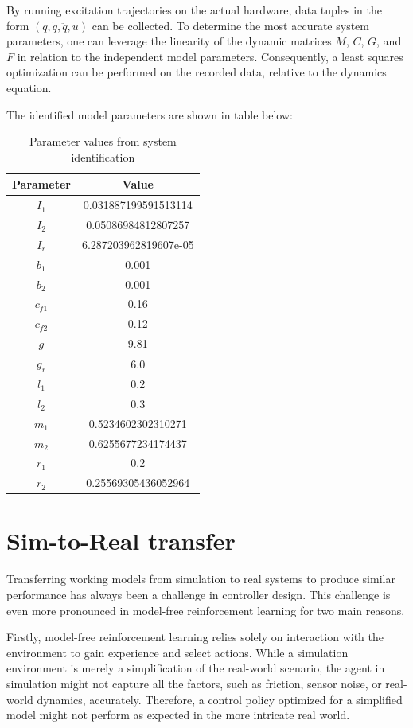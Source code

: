 By running excitation trajectories on the actual hardware, data tuples in the form \((q, \dot{q}, \ddot{q}, u)\) can be collected. To determine the most accurate system parameters, one can leverage the linearity of the dynamic matrices \(M\), \(C\), \(G\), and \(F\) in relation to the independent model parameters. Consequently, a least squares optimization can be performed on the recorded data, relative to the dynamics equation.

The identified model parameters are shown in table below:

\begin{table}[H]
\centering
\begin{tabular}{|c|c|}
\hline
\textbf{Parameter} & \textbf{Value} \\
\hline
$I_1$ & 0.031887199591513114 \\
$I_2$ & 0.05086984812807257 \\
$I_r$ & 6.287203962819607e-05 \\
$b_1$ & 0.001 \\
$b_2$ & 0.001 \\
$c_{f1}$ & 0.16 \\
$c_{f2}$ & 0.12 \\
$g$ & 9.81 \\
$g_r$ & 6.0 \\
$l_1$ & 0.2 \\
$l_2$ & 0.3 \\
$m_1$ & 0.5234602302310271 \\
$m_2$ & 0.6255677234174437 \\
$r_1$ & 0.2 \\
$r_2$ & 0.25569305436052964 \\
\hline
\end{tabular}
\caption{Parameter values from system identification}
\label{tab:parameters}
\end{table}


\section{Sim-to-Real transfer}
Transferring working models from simulation to real systems to produce similar performance has always been a challenge in controller design. This challenge is even more pronounced in model-free reinforcement learning for two main reasons.

Firstly, model-free reinforcement learning relies solely on interaction with the environment to gain experience and select actions. While a simulation environment is merely a simplification of the real-world scenario, the agent in simulation might not capture all the factors, such as friction, sensor noise, or real-world dynamics, accurately. Therefore, a control policy optimized for a simplified model might not perform as expected in the more intricate real world.

